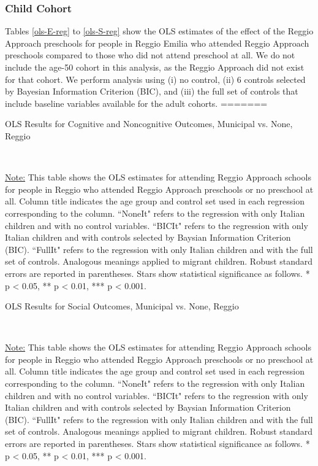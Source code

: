 \subsubsection{Child Cohort}

Tables \ref{ols-E-reg} to \ref{ols-S-reg} show the OLS estimates of the effect of the Reggio Approach preschools for people in Reggio Emilia who attended Reggio Approach preschools compared to those who did not attend preschool at all. We do not include the age-50 cohort in this analysis, as the Reggio Approach did not exist for that cohort. We perform analysis using (i) no control, (ii) 6 controls selected by Bayesian Information Criterion (BIC), and (iii) the full set of controls that include baseline variables available for the adult cohorts. 
=======
\begin{table}[H] \caption{OLS Results for Cognitive and Noncognitive Outcomes, Municipal vs. None, Reggio} \label{ols-CN-child-reg}

\vspace{1ex} \\
\footnotesize\raggedright{\underline{Note:} This table shows the OLS estimates for attending Reggio Approach schools for people in Reggio who attended Reggio Approach preschools or no preschool at all. Column title indicates the age group and control set used in each regression corresponding to the column. ``NoneIt" refers to the regression with only Italian children and with no control variables. ``BICIt" refers to the regression with only Italian children and with controls selected by Baysian Information Criterion (BIC). ``FullIt" refers to the regression with only Italian children and with the full set of controls. Analogous meanings applied to migrant children. Robust standard errors are reported in parentheses. Stars show statistical significance as follows. * p < 0.05, ** p < 0.01, *** p < 0.001.}
\end{table}

\begin{table}[H] \caption{OLS Results for Social Outcomes, Municipal vs. None, Reggio} \label{ols-S-child-reg}

\vspace{1ex} \\
\footnotesize\raggedright{\underline{Note:} This table shows the OLS estimates for attending Reggio Approach schools for people in Reggio who attended Reggio Approach preschools or no preschool at all. Column title indicates the age group and control set used in each regression corresponding to the column. ``NoneIt" refers to the regression with only Italian children and with no control variables. ``BICIt" refers to the regression with only Italian children and with controls selected by Baysian Information Criterion (BIC). ``FullIt" refers to the regression with only Italian children and with the full set of controls. Analogous meanings applied to migrant children. Robust standard errors are reported in parentheses. Stars show statistical significance as follows. * p < 0.05, ** p < 0.01, *** p < 0.001.}
\end{table}

